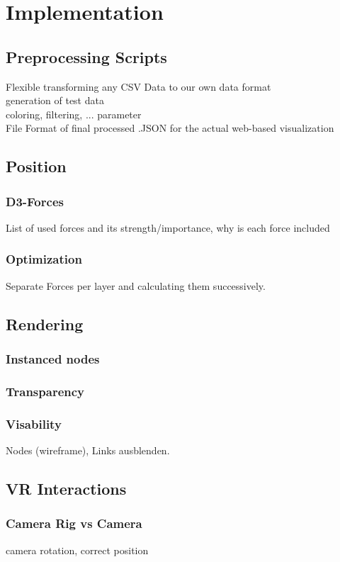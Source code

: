 \chapter{Implementation}


\section{Preprocessing Scripts}

Flexible transforming any CSV Data to our own data format \\
generation of test data \\
coloring, filtering, ... parameter \\
File Format of final processed .JSON for the actual web-based visualization \\

\section{Position}
\subsection{D3-Forces}
List of used forces and its strength/importance, why is each force included
\subsection{Optimization}
Separate Forces per layer and calculating them successively.

\section{Rendering}
\subsection{Instanced nodes}
\subsection{Transparency}
\subsection{Visability}
Nodes (wireframe), Links ausblenden.

\section{VR Interactions}
\subsection{Camera Rig vs Camera}
camera rotation, correct position 
